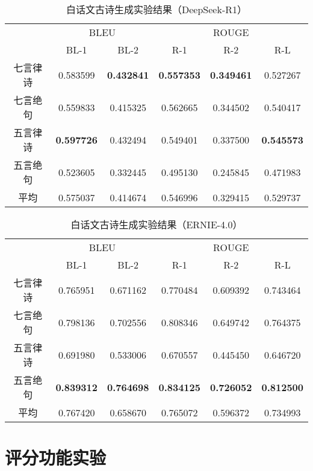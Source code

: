 \begin{table}[ht]
  \centering
  \caption{白话文古诗生成实验结果（DeepSeek-R1）}
  \label{tab:test_generation_tssbs_dsr1}
  \begin{tabular}{cccccc}
      \toprule
      & \multicolumn{2}{c}{BLEU} & \multicolumn{3}{c}{ROUGE} \\
      \cmidrule(r){2-3} \cmidrule(l){4-6}
      & BL-1& BL-2& R-1& R-2& R-L\\
      \midrule
      七言律诗& 0.583599&\bf{0.432841}&\bf{0.557353}&\bf{0.349461}&0.527267\\
      七言绝句&0.559833&0.415325&0.562665&0.344502&0.540417\\
      五言律诗&\bf{0.597726}&0.432494&0.549401&0.337500&\bf{0.545573}\\
      五言绝句&0.523605&0.332445&0.495130&0.245845&0.471983\\
      \cmidrule{2-6} %
      平均&0.575037&0.414674&0.546996&0.329415&0.529737\\
      \bottomrule
  \end{tabular}
\end{table}

\begin{table}[ht]
  \centering
  \caption{白话文古诗生成实验结果（ERNIE-4.0）}
  \label{tab:test_generation_tssbs_ernie4}
  \begin{tabular}{cccccc}
      \toprule
      & \multicolumn{2}{c}{BLEU} & \multicolumn{3}{c}{ROUGE} \\
      \cmidrule(r){2-3} \cmidrule(l){4-6}
      & BL-1& BL-2& R-1& R-2& R-L\\
      \midrule
      七言律诗&0.765951&0.671162&0.770484&0.609392&0.743464\\
      七言绝句&0.798136&0.702556&0.808346&0.649742&0.764375\\
      五言律诗&0.691980&0.533006&0.670557&0.445450&0.646720\\
      五言绝句&\bf{0.839312}&\bf{0.764698}&\bf{0.834125}&\bf{0.726052}&\bf{0.812500}\\
      \cmidrule{2-6} %
      平均&0.767420&0.658670&0.765072&0.596372&0.734993\\
      \bottomrule
  \end{tabular}
\end{table}

\section{评分功能实验}

